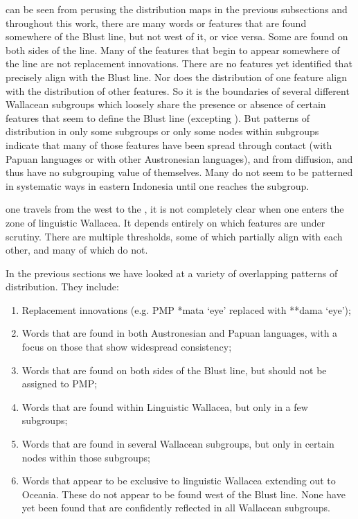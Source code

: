  can be seen from perusing the distribution maps in the previous
subsections and throughout this work,
there are many words or features that are found somewhere 
of the Blust line,
but not west of it, or vice versa.
Some are found on both sides of the line.
Many of the features that begin to appear somewhere  of the
line are not replacement innovations.
There are no features yet identified that precisely align with the Blust line.
Nor does the distribution of one feature align with the distribution of other features.
So it is the boundaries of several different Wallacean subgroups
which loosely share the presence or absence of certain features
that seem to define the Blust line (excepting ).
But patterns of distribution in only some subgroups or only some
nodes within subgroups indicate that many of those features have
been spread through contact (with Papuan languages or with other
Austronesian languages), and from diffusion, and thus have no subgrouping value of themselves.
Many do not seem to be patterned in systematic ways in eastern
Indonesia until one reaches the  subgroup.

 one travels from the west to the ,
it is not completely clear when one enters the zone of linguistic Wallacea.
It depends entirely on which features are under scrutiny.
There are multiple thresholds,
some of which partially align with each other,
and many of which do not.

In the previous sections we have looked at a variety of overlapping patterns of distribution.
They include: 

\begin{enumerate}
	\item	Replacement innovations (e.g.
				PMP *mata ‘eye’ replaced with  **dama ‘eye’);
	\item	Words that are found in both Austronesian
				and Papuan languages, with a focus on those that show widespread
				consistency; \item	Words that are found on both sides of the Blust line,
				but should not be assigned to PMP;
	\item	Words that are found within Linguistic Wallacea,
				but only in a few subgroups;
	\item	Words that are found in several Wallacean subgroups,
				but only in certain nodes within those subgroups;
	\item	Words that appear to be exclusive to linguistic Wallacea
				extending out to Oceania.
				These do not appear to be found west of the Blust line.
				None have yet been found that are confidently reflected in all Wallacean subgroups.
\end{enumerate}

